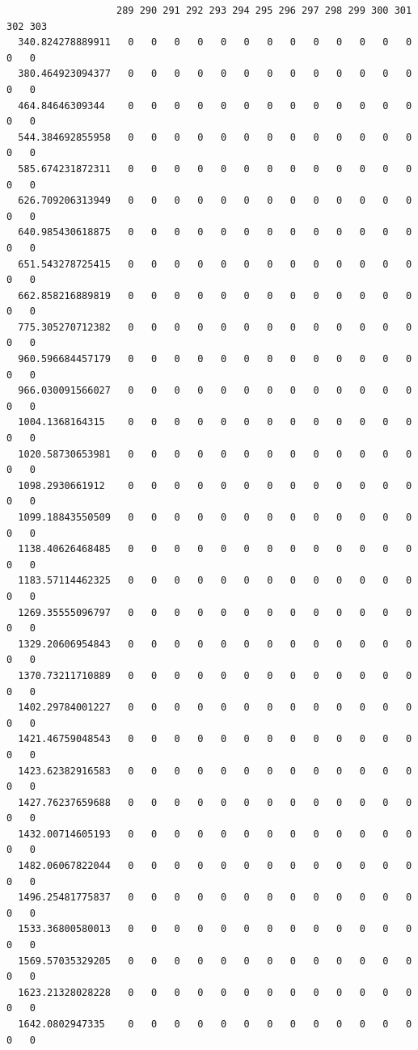 \documentclass[
  letterpaper,
  DIV=11,
  numbers=noendperiod]{scrartcl}
\begin{document}
\begin{verbatim}
                   289 290 291 292 293 294 295 296 297 298 299 300 301 302 303
  340.824278889911   0   0   0   0   0   0   0   0   0   0   0   0   0   0   0
  380.464923094377   0   0   0   0   0   0   0   0   0   0   0   0   0   0   0
  464.84646309344    0   0   0   0   0   0   0   0   0   0   0   0   0   0   0
  544.384692855958   0   0   0   0   0   0   0   0   0   0   0   0   0   0   0
  585.674231872311   0   0   0   0   0   0   0   0   0   0   0   0   0   0   0
  626.709206313949   0   0   0   0   0   0   0   0   0   0   0   0   0   0   0
  640.985430618875   0   0   0   0   0   0   0   0   0   0   0   0   0   0   0
  651.543278725415   0   0   0   0   0   0   0   0   0   0   0   0   0   0   0
  662.858216889819   0   0   0   0   0   0   0   0   0   0   0   0   0   0   0
  775.305270712382   0   0   0   0   0   0   0   0   0   0   0   0   0   0   0
  960.596684457179   0   0   0   0   0   0   0   0   0   0   0   0   0   0   0
  966.030091566027   0   0   0   0   0   0   0   0   0   0   0   0   0   0   0
  1004.1368164315    0   0   0   0   0   0   0   0   0   0   0   0   0   0   0
  1020.58730653981   0   0   0   0   0   0   0   0   0   0   0   0   0   0   0
  1098.2930661912    0   0   0   0   0   0   0   0   0   0   0   0   0   0   0
  1099.18843550509   0   0   0   0   0   0   0   0   0   0   0   0   0   0   0
  1138.40626468485   0   0   0   0   0   0   0   0   0   0   0   0   0   0   0
  1183.57114462325   0   0   0   0   0   0   0   0   0   0   0   0   0   0   0
  1269.35555096797   0   0   0   0   0   0   0   0   0   0   0   0   0   0   0
  1329.20606954843   0   0   0   0   0   0   0   0   0   0   0   0   0   0   0
  1370.73211710889   0   0   0   0   0   0   0   0   0   0   0   0   0   0   0
  1402.29784001227   0   0   0   0   0   0   0   0   0   0   0   0   0   0   0
  1421.46759048543   0   0   0   0   0   0   0   0   0   0   0   0   0   0   0
  1423.62382916583   0   0   0   0   0   0   0   0   0   0   0   0   0   0   0
  1427.76237659688   0   0   0   0   0   0   0   0   0   0   0   0   0   0   0
  1432.00714605193   0   0   0   0   0   0   0   0   0   0   0   0   0   0   0
  1482.06067822044   0   0   0   0   0   0   0   0   0   0   0   0   0   0   0
  1496.25481775837   0   0   0   0   0   0   0   0   0   0   0   0   0   0   0
  1533.36800580013   0   0   0   0   0   0   0   0   0   0   0   0   0   0   0
  1569.57035329205   0   0   0   0   0   0   0   0   0   0   0   0   0   0   0
  1623.21328028228   0   0   0   0   0   0   0   0   0   0   0   0   0   0   0
  1642.0802947335    0   0   0   0   0   0   0   0   0   0   0   0   0   0   0

\end{verbatim}
\end{document}
